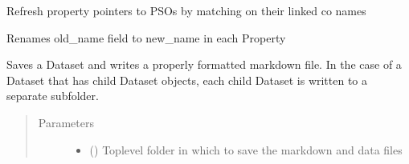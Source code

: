 \documentclass[letterpaper,10pt,english]{sphinxmanual}
\begin{document}
\begin{fulllineitems}
\begin{fulllineitems}
\label{\detokenize{dataset:colabfit.tools.dataset.Dataset.refresh_property_settings}}
\sphinxAtStartPar
Refresh property pointers to PSOs by matching on their linked co names

\end{fulllineitems}


\begin{fulllineitems}
\label{\detokenize{dataset:colabfit.tools.dataset.Dataset.rename_property}}
\sphinxAtStartPar
Renames old\_name field to new\_name in each Property

\end{fulllineitems}


\begin{fulllineitems}
\label{\detokenize{dataset:colabfit.tools.dataset.Dataset.to_markdown}}
\sphinxAtStartPar
Saves a Dataset and writes a properly formatted markdown file. In the
case of a Dataset that has child Dataset objects, each child Dataset
is written to a separate sub\sphinxhyphen{}folder.
\begin{quote}\begin{description}
\item[{Parameters}] \leavevmode\begin{itemize}
\item {} 
\sphinxAtStartPar
{} () \textendash{} Top\sphinxhyphen{}level folder in which to save the markdown and data files


\end{itemize}
\end{description}
\end{quote}
\end{fulllineitems}
\end{fulllineitems}
\end{document}

